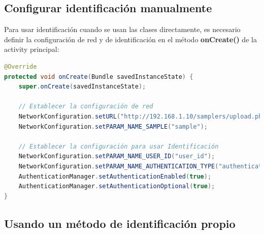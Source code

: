 \subsection{Configurar identificación manualmente} \label{sec:identificacion_manual}

Para usar identificación cuando se usan las clases directamente, es necesario definir la configuración de red y de identificación en el método \textbf{onCreate()} de la activity principal:

\begin{lstlisting}[language=Java, frame=tlbr, caption=Ejemplo de configuración de identificación en el método onCreate.]	
@Override
protected void onCreate(Bundle savedInstanceState) {
	super.onCreate(savedInstanceState);

	// Establecer la configuración de red
	NetworkConfiguration.setURL("http://192.168.1.10/samplers/upload.php");
	NetworkConfiguration.setPARAM_NAME_SAMPLE("sample");
	
	// Establecer la configuración para usar Identificación
	NetworkConfiguration.setPARAM_NAME_USER_ID("user_id");
	NetworkConfiguration.setPARAM_NAME_AUTHENTICATION_TYPE("authentication_type");	
	AuthenticationManager.setAuthenticationEnabled(true);
	AuthenticationManager.setAuthenticationOptional(true);
}
\end{lstlisting}


\subsection{Usando un método de identificación propio} \label{sec:usar_auth_propia}

